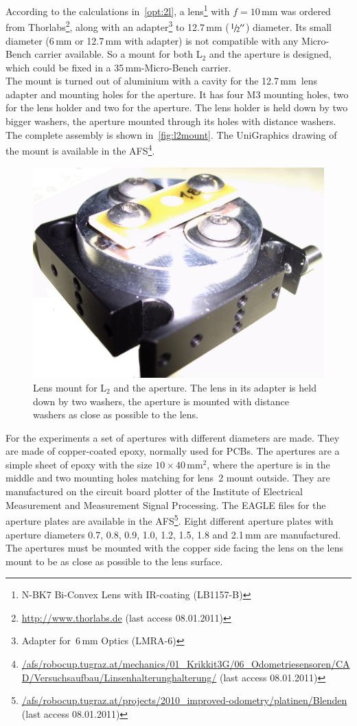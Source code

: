 \documentclass[12pt,a4paper]{article}
\newcommand{\EMT}{Institute of Electrical Measurement and Measurement Signal Processing}
\begin{document}
According to the calculations in~\autoref{opt:2l}, a lens\footnote{N-BK7 Bi-Convex Lens with IR-coating (LB1157-B)} with $f=10$\,mm was ordered from Thorlabs\footnote{\url{http://www.thorlabs.de} (last access 08.01.2011) }, along with an adapter\footnote{Adapter for \diameter\,6\,mm Optics (LMRA-6)} to 12.7\,mm ($\sfrac{1}{2}''$) diameter.
Its small diameter (6\,mm or 12.7\,mm with adapter) is not compatible with any Micro-Bench carrier available.
So a mount for both L$_2$ and the aperture is designed, which could be fixed in a 35\,mm-Micro-Bench carrier.\\
The mount is turned out of aluminium with a cavity for the 12.7\,mm~lens adapter and mounting holes for the aperture.
It has four M3 mounting holes, two for the lens holder and two for the aperture.
The lens holder is held down by two bigger washers, the aperture mounted through its holes with distance washers.
The complete assembly is shown in~\autoref{fig:l2mount}.
The UniGraphics drawing of the mount is available in the AFS\footnote{\url{/afs/robocup.tugraz.at/mechanics/01_Krikkit3G/06_Odometriesensoren/CAD/Versuchsaufbau/Linsenhalterunghalterung/} (last access 08.01.2011) }.

\begin{figure}[htbp]
\begin{center}
\includegraphics[width=0.4\columnwidth]{figures/lens-mount.jpg}
\caption{\label{fig:l2mount}
Lens mount for L$_2$ and the aperture.
The lens in its adapter is held down by two washers,
the aperture is mounted with distance washers as close as possible to the lens.
}
\end{center}
\end{figure}

For the experiments a set of apertures with different diameters are made.
They are made of copper-coated epoxy, normally used for PCBs.
The apertures are a simple sheet of epoxy with the size $10\times40$\,mm$^2$, where the aperture is in the middle and two mounting holes matching for lens~2 mount outside.
They are manufactured on the circuit board plotter of the \EMT. 
The EAGLE files for the aperture plates are available in the AFS\footnote{\url{/afs/robocup.tugraz.at/projects/2010_improved-odometry/platinen/Blenden} (last access 08.01.2011)}.
Eight different aperture plates with aperture diameters 0.7, 0.8, 0.9, 1.0, 1.2, 1.5, 1.8 and 2.1\,mm are manufactured.
The apertures must be mounted with the copper side facing the lens on the lens mount to be as close as possible to the lens surface.
\end{document}
